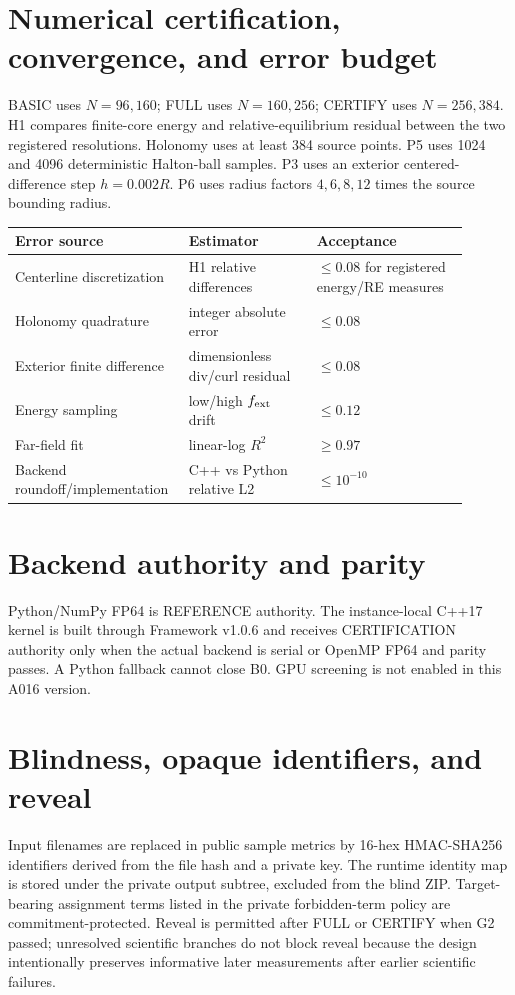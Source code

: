 \documentclass[11pt,a4paper]{article}
\begin{document}
\section{Numerical certification, convergence, and error budget}
BASIC uses $N=96,160$; FULL uses $N=160,256$; CERTIFY uses $N=256,384$. H1 compares finite-core energy and relative-equilibrium residual between the two registered resolutions. Holonomy uses at least 384 source points. P5 uses 1024 and 4096 deterministic Halton-ball samples. P3 uses an exterior centered-difference step $h=0.002R$. P6 uses radius factors $4,6,8,12$ times the source bounding radius.

\begin{longtable}{p{0.31\linewidth}p{0.27\linewidth}p{0.32\linewidth}}
\toprule
Error source & Estimator & Acceptance \\
\midrule
Centerline discretization & H1 relative differences & $\le0.08$ for registered energy/RE measures \\
Holonomy quadrature & integer absolute error & $\le0.08$ \\
Exterior finite difference & dimensionless div/curl residual & $\le0.08$ \\
Energy sampling & low/high $f_{\rm ext}$ drift & $\le0.12$ \\
Far-field fit & linear-log $R^2$ & $\ge0.97$ \\
Backend roundoff/implementation & C++ vs Python relative L2 & $\le10^{-10}$ \\
\bottomrule
\end{longtable}

\section{Backend authority and parity}
Python/NumPy FP64 is REFERENCE authority. The instance-local C++17 kernel is built through Framework v1.0.6 and receives CERTIFICATION authority only when the actual backend is serial or OpenMP FP64 and parity passes. A Python fallback cannot close B0. GPU screening is not enabled in this A016 version.

\section{Blindness, opaque identifiers, and reveal}
Input filenames are replaced in public sample metrics by 16-hex HMAC-SHA256 identifiers derived from the file hash and a private key. The runtime identity map is stored under the private output subtree, excluded from the blind ZIP. Target-bearing assignment terms listed in the private forbidden-term policy are commitment-protected. Reveal is permitted after FULL or CERTIFY when G2 passed; unresolved scientific branches do not block reveal because the design intentionally preserves informative later measurements after earlier scientific failures.
\end{document}
